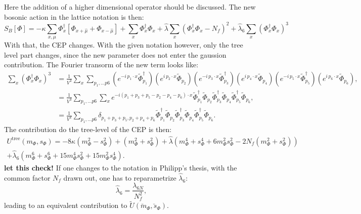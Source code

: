 Here the addition of a higher dimensional operator should be discussed. The new bosonic action in the lattice notation is then:
\begin{equation}\label{eq:bosonicLatticeActionWithLambda_6}
 S_B[\Phi]  = -\kappa \sum\limits_{x,\mu} \Phi_x^{\dagger} \left[\Phi_{x+\hat\mu} + \Phi_{x-\hat\mu} \right] 
              + \sum\limits_x \Phi_x^{\dagger} \Phi_x 
              + \hat{\lambda} \sum\limits_x \left( \Phi_x^{\dagger} \Phi_x - N_f\right)^2 + \hat \lambda_6 \sum\limits_x \left( \Phi_x^{\dagger} \Phi_x \right)^3
\end{equation}
With that, the CEP changes. With the given notation however, only the tree level part changes, since the new parameter does not enter the gaussion contribution.
The Fourier transorm of the new term looks like:
\begin{align}
 \sum\limits_{x} \left( \Phi_x^{\dagger} \Phi_x \right)^3 &= 
                     \frac{1}{V^3}  \sum\limits_{x}  \sum\limits_{p_1,\dots p6}  
                     \left( e^{-i\, p_1 \cdot x}  \tilde\Phi_{p_1}^{\dagger} \right) \left( e^{i\, p_2 \cdot x}  \tilde\Phi_{p_2} \right)
                     \left( e^{-i\, p_3 \cdot x}  \tilde\Phi_{p_3}^{\dagger} \right) \left( e^{i\, p_4 \cdot x}  \tilde\Phi_{p_4} \right)
                     \left( e^{-i\, p_5 \cdot x}  \tilde\Phi_{p_5}^{\dagger} \right) \left( e^{i\, p_6 \cdot x}  \tilde\Phi_{p_6} \right), \nonumber \\
                  &= \frac{1}{V^3}  \sum\limits_{p_1,\dots p6} 
                     \sum\limits_{x}  e^{ -i (p_1 + p_3 + p_5 - p_2 - p_4 - p_6) \cdot x }  
                     \tilde\Phi_{p_1}^{\dagger} \tilde\Phi_{p_2} \tilde\Phi_{p_3}^{\dagger} \tilde\Phi_{p_4} \tilde\Phi_{p_5}^{\dagger} \tilde\Phi_{p_6},
                     \nonumber \\
                  &= \frac{1}{V^2}\sum\limits_{p_1,\dots p6} \delta_{p_1 + p_3 + p_5, p_2 + p_4 + p_6} 
                     \tilde\Phi_{p_1}^{\dagger} \tilde\Phi_{p_2} \tilde\Phi_{p_3}^{\dagger} \tilde\Phi_{p_4} \tilde\Phi_{p_5}^{\dagger} \tilde\Phi_{p_6}
                      \label{eq:FourierTrafoPhiToTheSix}.
\end{align}
The contribution do the tree-level of the CEP is then:
\begin{multline}\label{eq:CEP_tree_level_Contribution_from_lambda_6}
 U^{\text{tree}}(m_{\Phi},s_{\Phi}) = -8 \kappa \left( m_{\Phi}^2 - s_{\Phi}^2 \right)   +   \left( m_{\Phi}^2 + s_{\Phi}^2 \right) 
                         + \hat\lambda \left( m_{\Phi}^4 + s_{\Phi}^4 + 6 m_{\Phi}^2 s_{\Phi}^2 - 2 N_f \left(m_{\Phi}^2 + s_{\Phi}^2 \right) \right) \\
                         + \hat\lambda_6 \left( m_{\Phi}^6 + s_{\Phi}^6 + 15 m_{\Phi}^4 s_{\Phi}^2 + 15 m_{\Phi}^2 s_{\Phi}^4\right).
\end{multline}
\textbf{let this check!}
If one changes to the notation in Philipp's thesis, with the common factor $N_f$ drawn out, one has to reparametrize $\hat\lambda_6$:
\begin{equation}\label{eq:lambda_6_reparametrized}
 \hat \lambda_6 = \frac{\lambda_{6N}}{N_f^2},
\end{equation}
leading to an equivalent contribution to $\tilde U(\breve{m}_{\Phi},\breve{s}_{\Phi})$.

